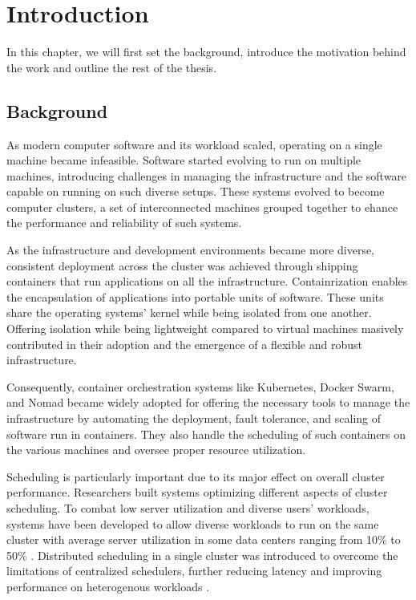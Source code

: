 
\chapter{Introduction} 

In this chapter, we will first set the background, introduce the motivation
behind the work and outline the rest of the thesis.  

\section{Background}
As modern computer software and its workload scaled, operating on a single
machine became infeasible. Software started evolving to run on multiple
machines, introducing challenges in managing the infrastructure and the
software capable on running on such diverse setups. These systems evolved to
become computer clusters, a set of interconnected machines grouped together to
ehance the performance and reliability of such systems. 

As the infrastructure and development environments became more diverse,
consistent deployment across the cluster was achieved through shipping
containers that run applications on all the infrastructure. Containrization
enables the encapsulation of applications into portable units of software.
These units share the operating systems' kernel while being isolated from one
another. Offering isolation while being lightweight compared to virtual
machines masively contributed in their adoption and the emergence of a flexible
and robust infrastructure. 

Consequently, container orchestration systems like Kubernetes, Docker Swarm,
and Nomad \cite{noauthor_swarm_0100, verma_large-scale_2015,
noauthor_multi-region_nodate} became widely adopted for offering the necessary
tools to manage the infrastructure by automating the deployment, fault
tolerance, and scaling of software run in containers. They also handle the
scheduling of such containers on the various machines and oversee proper
resource utilization.  

Scheduling is particularly important due to its major effect on overall cluster
performance. Researchers built systems optimizing different aspects of cluster
scheduling. To combat low server utilization and diverse users' workloads,
systems have been developed to allow diverse workloads to run on the same
cluster \cite{bhattacharya_hierarchical_2013, hindman_mesos_nodate} with
average server utilization in some data centers ranging from 10\% to 50\%
\cite{lo_heracles_2015}. Distributed scheduling in a single cluster was
introduced to overcome the limitations of centralized schedulers, further
reducing latency and improving performance on heterogenous workloads
\cite{schwarzkopf_omega_2013, boutin_apollo_2014}. 


